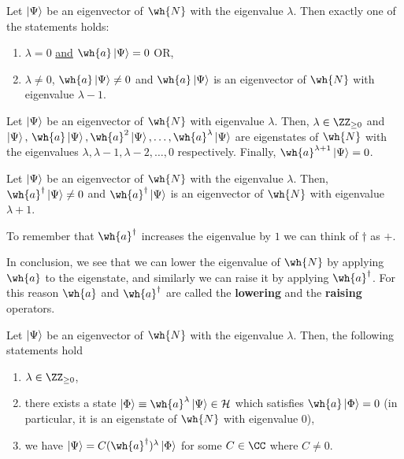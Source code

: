 \documentclass[12pt, a4paper]{article}
\begin{document}
\begin{lemma}
    Let \(\ket{\Psi}\) be an eigenvector of \(\wh{N}\) with the eigenvalue \(\lambda\). Then exactly one of the statements holds:
    \begin{enumerate}
        \item \(\lambda=0\) \underline{and} \(\wh{a} \ket{\Psi}=0\) OR, 
        \item \(\lambda \neq 0\), \(\wh{a} \ket{\Psi} \neq 0\) and \(\wh{a} \ket{\Psi}\) is an eigenvector of \(\wh{N}\) with eigenvalue \(\lambda-1\).
    \end{enumerate}
\end{lemma}

\begin{lemma}
    Let \(\ket{\Psi}\) be an eigenvector of \(\wh{N}\) with eigenvalue \(\lambda\). Then, \(\lambda \in \ZZ_{\geq 0}\) and \(\ket{\Psi}, \, \wh{a}\ket{\Psi}, \\\wh{a}^2\ket{\Psi}, \ldots ,  \wh{a}^{\lambda} \ket{\Psi}\) are eigenstates of \(\wh{N}\) with the eigenvalues \(\lambda, \lambda-1,\lambda-2, \ldots, 0\) respectively. Finally, \(\wh{a}^{\lambda+1} \ket{\Psi}=0\).
\end{lemma}

\begin{mdlemma}
    Let \(\ket{\Psi}\) be an eigenvector of \(\wh{N}\) with the eigenvalue \(\lambda\). Then, \(\wh{a}^{\dagger}\ket{\Psi} \neq 0 \) and \(\wh{a}^{\dagger}\ket{\Psi}\) is an eigenvector of \(\wh{N}\) with eigenvalue \(\lambda+1\).
\end{mdlemma}

\begin{mdnote}
    To remember that \({\wh{a}}^{\dagger}\) increases the eigenvalue by \(1\) we can think of \(\dagger\) as \(+\).
\end{mdnote}

\begin{mdnote}
    In conclusion, we see that we can lower the eigenvalue of \(\wh{N}\) by applying \(\wh{a}\) to the eigenstate, and similarly we can raise it by applying \(\wh{a}^{\dagger}\). For this reason \(\wh{a}\) and \(\wh{a}^{\dagger}\) are called the \textbf{lowering} and the \textbf{raising} operators. 
\end{mdnote}

\begin{mdlemma}
    Let \(\ket{\Psi}\) be an eigenvector of \(\wh{N}\) with the eigenvalue \(\lambda\). Then, the following statements hold 
    \begin{enumerate}
        \item \(\lambda \in \ZZ_{\geq 0}\),
        \item there exists a state \(\ket{\Phi} \equiv \wh{a}^{\lambda}\ket{\Psi} \in \mathcal{H}\) which satisfies \(\wh{a}\ket{\Phi}=0\) (in particular, it is an eigenstate of \(\wh{N}\) with eigenvalue \(0\)),
        \item we have \(\ket{\Psi} = C (\wh{a}^{\dagger})^{\lambda}\ket{\Phi}\) for some \(C \in \CC\) where \(C \neq 0\).
    \end{enumerate}
\end{mdlemma}
\end{document}
